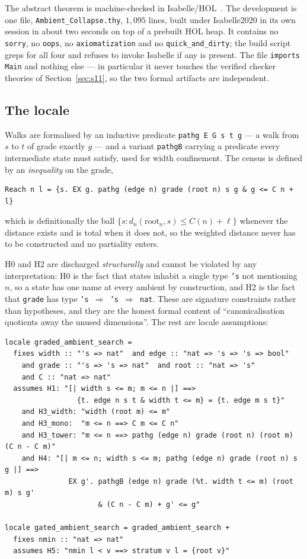 \documentclass[11pt,a4paper]{article}
\theoremstyle{plain}
\theoremstyle{definition}
\theoremstyle{remark}
\begin{document}
The abstract theorem is machine-checked in Isabelle/HOL~\cite{Isabelle}. The
development is one file, \texttt{Ambient\_Collapse.thy}, $1{,}095$ lines, built
under Isabelle2020 in its own session in about two seconds on top of a prebuilt
HOL heap. It contains no \texttt{sorry}, no \texttt{oops}, no
\texttt{axiomatization} and no \texttt{quick\_and\_dirty}; the build script
greps for all four and refuses to invoke Isabelle if any is present. The file
\texttt{imports Main} and nothing else --- in particular it never touches the
verified checker theories of Section~\ref{sec:s11}, so the two formal artifacts
are independent.

\subsection{The locale}

Walks are formalised by an inductive predicate \texttt{pathg E G s t g} --- a
walk from $s$ to $t$ of grade exactly $g$ --- and a variant \texttt{pathgB}
carrying a predicate every intermediate state must satisfy, used for width
confinement. The census is defined by an \emph{inequality} on the grade,
\begin{lstlisting}
Reach n l = {s. EX g. pathg (edge n) grade (root n) s g & g <= C n + l}
\end{lstlisting}
which is definitionally the ball $\{s : d_n(\mathrm{root}_n,s) \le C(n)+\ell\}$
whenever the distance exists and is total when it does not, so the weighted
distance never has to be constructed and no partiality enters.

H0 and H2 are discharged \emph{structurally} and cannot be violated by any
interpretation: H0 is the fact that states inhabit a single type \texttt{'s}
not mentioning $n$, so a state has one name at every ambient by construction,
and H2 is the fact that \texttt{grade} has type
\texttt{'s $\Rightarrow$ 's $\Rightarrow$ nat}. These are signature constraints
rather than hypotheses, and they are the honest formal content of
``canonicalisation quotients away the unused dimensions''. The rest are locale
assumptions:

\begin{lstlisting}
locale graded_ambient_search =
  fixes width :: "'s => nat"  and edge :: "nat => 's => 's => bool"
    and grade :: "'s => 's => nat"  and root :: "nat => 's"
    and C :: "nat => nat"
  assumes H1: "[| width s <= m; m <= n |] ==>
                 {t. edge n s t & width t <= m} = {t. edge m s t}"
    and H3_width: "width (root m) <= m"
    and H3_mono:  "m <= n ==> C m <= C n"
    and H3_tower: "m <= n ==> pathg (edge n) grade (root n) (root m) (C n - C m)"
    and H4: "[| m <= n; width s <= m; pathg (edge n) grade (root n) s g |] ==>
               EX g'. pathgB (edge n) grade (%t. width t <= m) (root m) s g'
                      & (C n - C m) + g' <= g"

locale gated_ambient_search = graded_ambient_search +
  fixes nmin :: "nat => nat"
  assumes H5: "nmin l < v ==> stratum v l = {root v}"
\end{lstlisting}
\end{document}
